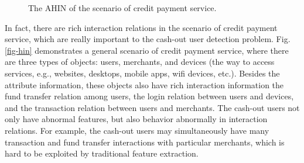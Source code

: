 \begin{figure}[t]
\centering
{}
\caption{The AHIN of the scenario of credit payment service.}
\label{fig:network_analysis}
\end{figure}


In fact, there are rich interaction relations in the scenario of credit payment service, which are really important to the cash-out user detection problem.  
Fig. \ref{fig-hin} demonstrates a general scenario of credit payment service, where there are three types of objects: users, merchants, and devices (the way to access services, e.g., websites, desktops, mobile apps, wifi devices, etc.). 
Besides the attribute information, these objects also have rich interaction information \eg the fund transfer relation among users, the login relation between users and devices, and the transaction relation between users and merchants. 
The cash-out users not only have abnormal features, but also behavior abnormally in interaction relations. 
For example, the cash-out users may simultaneously have many transaction and fund transfer interactions with particular merchants, which is hard to be exploited by traditional feature extraction. 

